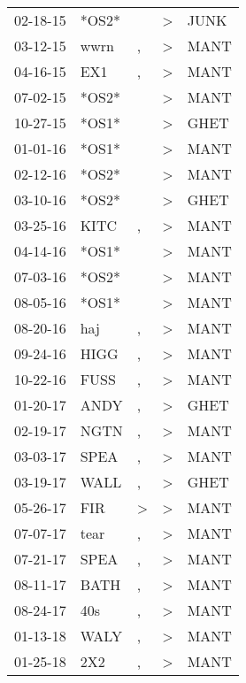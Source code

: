\begin{supertabular}{lllll}
 02-18-15 &  *OS2* &               &  \textgreater &  JUNK \\
 03-12-15 &   wwrn &             , &  \textgreater &  MANT \\
 04-16-15 &    EX1 &             , &  \textgreater &  MANT \\
 07-02-15 &  *OS2* &               &  \textgreater &  MANT \\
 10-27-15 &  *OS1* &               &  \textgreater &  GHET \\
 01-01-16 &  *OS1* &               &  \textgreater &  MANT \\
 02-12-16 &  *OS2* &               &  \textgreater &  MANT \\
 03-10-16 &  *OS2* &               &  \textgreater &  GHET \\
 03-25-16 &   KITC &             , &  \textgreater &  MANT \\
 04-14-16 &  *OS1* &               &  \textgreater &  MANT \\
 07-03-16 &  *OS2* &               &  \textgreater &  MANT \\
 08-05-16 &  *OS1* &               &  \textgreater &  MANT \\
 08-20-16 &    haj &             , &  \textgreater &  MANT \\
 09-24-16 &   HIGG &             , &  \textgreater &  MANT \\
 10-22-16 &   FUSS &             , &  \textgreater &  MANT \\
 01-20-17 &   ANDY &             , &  \textgreater &  GHET \\
 02-19-17 &   NGTN &             , &  \textgreater &  MANT \\
 03-03-17 &   SPEA &             , &  \textgreater &  MANT \\
 03-19-17 &   WALL &             , &  \textgreater &  GHET \\
 05-26-17 &    FIR &  \textgreater &  \textgreater &  MANT \\
 07-07-17 &   tear &             , &  \textgreater &  MANT \\
 07-21-17 &   SPEA &             , &  \textgreater &  MANT \\
 08-11-17 &   BATH &             , &  \textgreater &  MANT \\
 08-24-17 &    40s &             , &  \textgreater &  MANT \\
 01-13-18 &   WALY &             , &  \textgreater &  MANT \\
 01-25-18 &    2X2 &             , &  \textgreater &  MANT \\

\end{supertabular}
